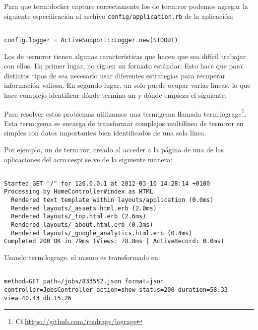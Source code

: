 Para que \gls{term:docker} capture correctamente los  de \gls{term:ror}
podemos agregar la siguiente especificación al archivo
\texttt{config/application.rb} de la aplicación:

\begin{lstlisting}

config.logger = ActiveSupport::Logger.new(STDOUT)

\end{lstlisting}

Los  de \gls{term:ror} tienen algunas características que hacen que
sea difícil trabajar con ellos. En primer lugar, no siguen un formato estándar.
Esto hace que para distintos tipos de  sea necesario usar diferentes
estrategias para recuperar información valiosa. En segundo lugar, un solo
 puede ocupar varias líneas, lo que hace complejo identificar dónde
termina un  y dónde empieza el siguiente.

Para resolver estos problemas utilizamos una \gls{term:gema} llamada
\gls{term:lograge}\footnote{Cf.\url{https://github.com/roidrage/lograge}}.
Esta \gls{term:gema} se encarga de transformar complejos  multilínea
de \gls{term:ror} en simples  con datos importantes bien identificados
de una sola línea.

Por ejemplo, un  de \gls{term:ror}, creado al acceder a la página 
de una de las aplicaciones del \gls{acro:cespi} se ve de la siguiente manera:

\begin{lstlisting}

Started GET "/" for 126.0.0.1 at 2012-03-10 14:28:14 +0100
Processing by HomeController#index as HTML
  Rendered text template within layouts/application (0.0ms)
  Rendered layouts/_assets.html.erb (2.0ms)
  Rendered layouts/_top.html.erb (2.6ms)
  Rendered layouts/_about.html.erb (0.3ms)
  Rendered layouts/_google_analytics.html.erb (0.4ms)
Completed 200 OK in 79ms (Views: 78.8ms | ActiveRecord: 0.0ms)

\end{lstlisting}

Usando \gls{term:lograge}, el mismo  es transformado en:

\begin{lstlisting}

method=GET path=/jobs/833552.json format=json controller=JobsController action=show status=200 duration=58.33 view=40.43 db=15.26

\end{lstlisting}

